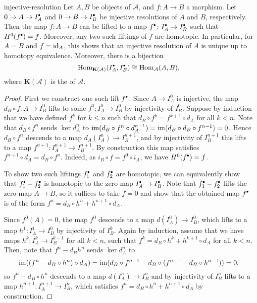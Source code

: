 \begin{example}{injective-resolution}
    Let $A, B$ be objects of $\mathcal{A}$, and $f \colon A \to B$ a morphism. Let $0 \to A \to I_A^\bdot$ and $0 \to B \to I_B^\bdot$ be injective resolutions of $A$ and $B$, respectively. Then the map $f \colon A \to B$ can be lifted to a map $f^\bdot \colon I_A^\bdot \to I_B^\bdot$ such that $H^0(f^\bdot) = f$. Moreover, any two such liftings of $f$ are homotopic. In particular, for $A = B$ and $f = \textup{id}_A$, this shows that an injective resolution of $A$ is unique up to homotopy equivalence. Moreover, there is a bijection
    \[ \Hom_{\textbf{K}(\mathcal{A})}(I_A^\bdot, I_B^\bdot) \isom \Hom_{\mathcal{A}}(A, B) , \]
    where $\textbf{K}(\mathcal{A})$ is the  of $\mathcal{A}$.
    \begin{proof}
        First we construct one such lift $f^\bdot$. Since $A \to I_A^0$ is injective, the map $d_B \circ f \colon A \to I_B^0$ lifts to some $f^0 \colon I_A^0 \to I_B^0$ by injectivity of $I_B^0$. Suppose by induction that we have defined $f^k$ for $k \le n$ such that $d_B \circ f^k = f^{k + 1} \circ d_A$ for all $k < n$. Note that $d_B \circ f^n$ sends $\ker d_A^n$ to $\operatorname{im} (d_B \circ f^n \circ d_A^{n - 1}) = \operatorname{im} (d_B \circ d_B \circ f^{n - 1}) = 0$. Hence $d_B \circ f^n$ descends to a map $d_A(I_A^n) \to I_B^{n + 1}$, and by injectivity of $I_B^{n + 1}$ this lifts to a map $f^{n + 1} \colon I_A^{n + 1} \to I_B^{n + 1}$. By construction this map satisfies $f^{n + 1} \circ d_A = d_B \circ f^n$. Indeed, as $i_B \circ f = f^0 \circ i_A$, we have $H^0(f^\bdot) = f$.
    
        To show two such liftings $f_1^\bdot$ and $f_2^\bdot$ are homotopic, we can equivalently show that $f_1^\bdot - f_2^\bdot$ is homotopic to the zero map $I_A^\bdot \to I_B^\bdot$. Note that $f_1^\bdot - f_2^\bdot$ lifts the zero map $A \to B$, so it suffices to take $f = 0$ and show that the obtained map $f^\bdot$ is of the form $f^n = d_B \circ h^n + h^{n + 1} \circ d_A$.
    
        Since $f^0(A) = 0$, the map $f^0$ descends to a map $d(I_A^0) \to I_B^0$, which lifts to a map $h^1 \colon I_A^1 \to I_B^0$ by injectivity of $I_B^0$. Again by induction, assume that we have maps $h^k \colon I_A^k \to I_B^{k - 1}$ for all $k < n$, such that $f^k = d_B \circ h^k + h^{k + 1} \circ d_A$ for all $k < n$. Then, note that $f^n - d_B h^n$ sends $\ker d_A^n$ to
        \[ \operatorname{im} ((f^n - d_B \circ h^n) \circ d_A) = \operatorname{im} (d_B \circ f^{n - 1} - d_B \circ (f^{n - 1} - d_B \circ h^{n - 1})) = 0 , \]
        so $f^n - d_B \circ h^n$ descends to a map $d(I_A^n) \to I_B^n$ and by injectivity of $I_B^n$ lifts to a map $h^{n + 1} \colon I_A^{n + 1} \to I_B^n$, which satisfies $f^n = d_B \circ h^n + h^{n + 1} \circ d_A$ by construction.
    \end{proof}
\end{example}

